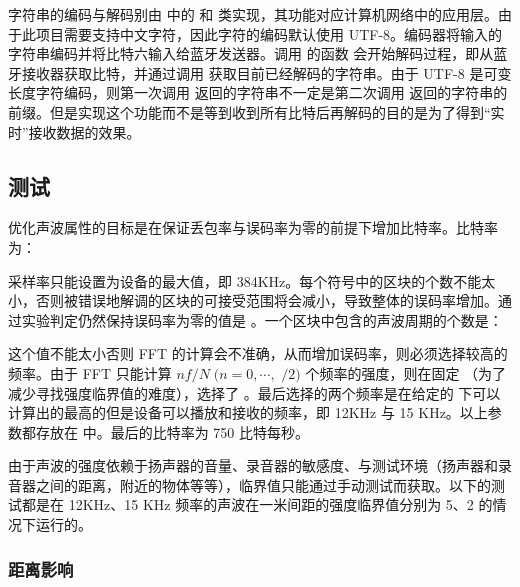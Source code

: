 字符串的编码与解码别由  中的  和  类实现，其功能对应计算机网络中的应用层。由于此项目需要支持中文字符，因此字符的编码默认使用 UTF-8。编码器将输入的字符串编码并将比特六输入给蓝牙发送器。调用  的函数  会开始解码过程，即从蓝牙接收器获取比特，并通过调用  获取目前已经解码的字符串。由于 UTF-8 是可变长度字符编码，则第一次调用  返回的字符串不一定是第二次调用  返回的字符串的前缀。但是实现这个功能而不是等到收到所有比特后再解码的目的是为了得到“实时”接收数据的效果。

\subsection{测试}

优化声波属性的目标是在保证丢包率与误码率为零的前提下增加比特率。比特率为：

\noindent{}

采样率只能设置为设备的最大值，即 384KHz。每个符号中的区块的个数不能太小，否则被错误地解调的区块的可接受范围将会减小，导致整体的误码率增加。通过实验判定仍然保持误码率为零的值是 。一个区块中包含的声波周期的个数是：

\noindent{}

这个值不能太小否则 FFT 的计算会不准确，从而增加误码率，则必须选择较高的频率。由于 FFT 只能计算 $nf/N\;(n=0,\cdots,$  $/2)$ 个频率的强度，则在固定 （为了减少寻找强度临界值的难度），选择了 。最后选择的两个频率是在给定的  下可以计算出的最高的但是设备可以播放和接收的频率，即 12KHz 与 15 KHz。以上参数都存放在  中。最后的比特率为 750 比特每秒。

\newpage

由于声波的强度依赖于扬声器的音量、录音器的敏感度、与测试环境（扬声器和录音器之间的距离，附近的物体等等），临界值只能通过手动测试而获取。以下的测试都是在 12KHz、15 KHz 频率的声波在一米间距的强度临界值分别为 5、2 的情况下运行的。

\subsubsection{距离影响}

